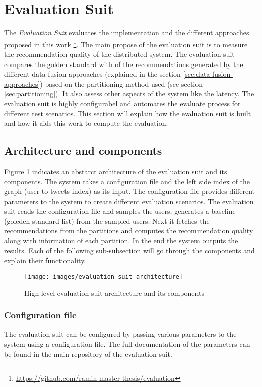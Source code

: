 \section{Evaluation Suit}
\label{sec:evaluation-suit}
The \emph{Evaluation Suit} evaluates the implementation and the different approaches proposed in this work \footnote{\url{https://github.com/ramin-master-thesis/evaluation}}. The main propose of the evaluation suit is to measure the recommendation quality of the distributed system. The evaluation suit compares the golden standard with of the recommendations generated by the different data fusion approaches (explained in the section \ref{sec:data-fusion-approaches}) based on the partitioning method used (see section \ref{sec:partitioning}). It also assess other aspects of the system like the latency. The evaluation suit is highly configurabel and automates the evaluate process for different test scenarios. This section will explain how the evaluation suit is built and how it aids this work to compute the evaluation.


\subsection{Architecture and components}
\label{sec:eval-suit-architecture-components}
Figure \ref{fig:evaluation-suit-architecture} indicates an abstarct architecture of the evaluation suit and its components. The system takes a configuration file and the left side index of the graph (user to tweets index) as its input. The configuration file provides different parameters to the system to create different evaluation scenarios. The evaluation suit reads the configuration file and samples the users, generates a baseline (goleden standard list) from the sampled users. Next it fetches the recommendations from the partitions and computes the recommendation quality along with information of each partition. In the end the system outputs the results. Each of the following sub-subsection will go through the components and explain their functionality.


\begin{figure}[!h]
	\centering
	\texttt{[image: images/evaluation-suit-architecture]}
	\caption{High level evaluation suit architecture and its components}
	\label{fig:evaluation-suit-architecture}
\end{figure}

\subsubsection{Configuration file}
\label{subsubsec:config-file}
The evaluation suit can be configured by passing various parameters to the system using a configuration file. The full documentation of the parameters can be found in the main repository of the evaluation suit.

